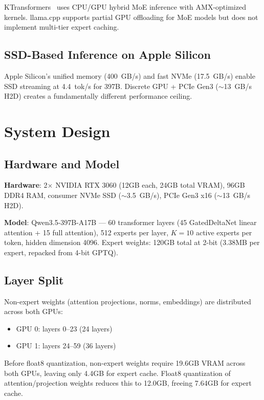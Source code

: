 \documentclass[conference]{IEEEtran}
\begin{document}
KTransformers~\cite{ktransformers2025} uses CPU/GPU hybrid MoE inference with AMX-optimized kernels. llama.cpp supports partial GPU offloading for MoE models but does not implement multi-tier expert caching.

\subsection{SSD-Based Inference on Apple Silicon}

Apple Silicon's unified memory (400~GB/s) and fast NVMe (17.5~GB/s) enable SSD streaming at 4.4~tok/s for 397B. Discrete GPU + PCIe Gen3 ($\sim$13~GB/s H2D) creates a fundamentally different performance ceiling.

\section{System Design}
\label{sec:method}

\subsection{Hardware and Model}

\textbf{Hardware}: 2$\times$ NVIDIA RTX 3060 (12GB each, 24GB total VRAM), 96GB DDR4 RAM, consumer NVMe SSD ($\sim$3.5~GB/s), PCIe Gen3 x16 ($\sim$13~GB/s H2D).

\textbf{Model}: Qwen3.5-397B-A17B --- 60 transformer layers (45 GatedDeltaNet linear attention + 15 full attention), 512 experts per layer, $K=10$ active experts per token, hidden dimension 4096. Expert weights: 120GB total at 2-bit (3.38MB per expert, repacked from 4-bit GPTQ).

\subsection{Layer Split}

Non-expert weights (attention projections, norms, embeddings) are distributed across both GPUs:
\begin{itemize}
    \item GPU 0: layers 0--23 (24 layers)
    \item GPU 1: layers 24--59 (36 layers)
\end{itemize}

Before float8 quantization, non-expert weights require 19.6GB VRAM across both GPUs, leaving only 4.4GB for expert cache. Float8 quantization of attention/projection weights reduces this to 12.0GB, freeing 7.64GB for expert cache.
\end{document}
